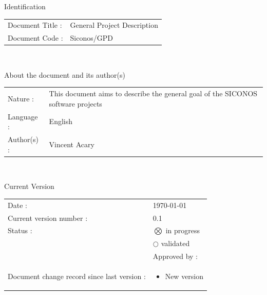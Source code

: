 
\normalsize

\begin{center}
  \textsf{\Large Identification}
\end{center}

\noindent\begin{tabular}{|p{}|p{}|}
\hline
Document Title : & \textsf{General Project Description} \\
Document Code :  & \textsf{Siconos/GPD} \\
\hline
\end{tabular}
\textsf{ }\\


\begin{center}
  \textsf{\Large About the document and its author(s)}
\end{center}

\noindent\begin{tabular}{|p{}|p{}|}
\hline
Nature :& \textsf{This document aims to describe the general goal of the SICONOS software projects}\\
Language :& \textsf{English}\\
Author(s) :& \textsf{Vincent Acary}\\
\hline
\end{tabular}

\textsf{ }\\



\begin{center}
  \textsf{\Large Current Version}
\end{center}
\begin{tabular}{|p{}|p{}|}
\hline
Date : &\textsf{\today}\\
Current version number : &\textsf{0.1}\\ 
Status :&$\bigotimes$ in progress\\
\textit{ } &$\bigcirc$ validated\\
\textit{ }& \hspace{0.5cm} Approved by :\\
\hline
Document change record since last version : &
\begin{minipage}[t]{0.70\textwidth}
  \begin{itemize}
  \item \textsf{New version}
  \end{itemize}
\end{minipage}\\
\hline
\end{tabular}


